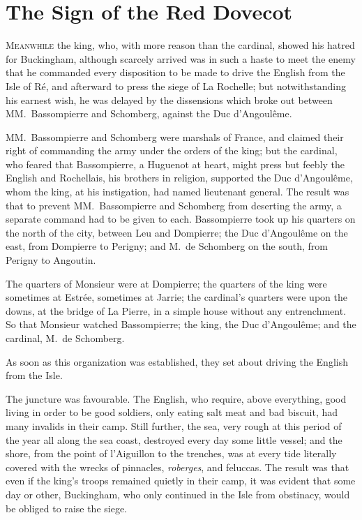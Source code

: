 
\chapter{The Sign of the Red Dovecot}

\lettrine{M}{eanwhile} the king, who, with more reason than the cardinal, showed his hatred for Buckingham, although scarcely arrived was in such a haste to meet the enemy that he commanded every disposition to be made to drive the English from the Isle of Ré, and afterward to press the siege of La Rochelle; but notwithstanding his earnest wish, he was delayed by the dissensions which broke out between MM.~Bassompierre and Schomberg, against the Duc d'Angoulême. 

MM.~Bassompierre and Schomberg were marshals of France, and claimed their right of commanding the army under the orders of the king; but the cardinal, who feared that Bassompierre, a Huguenot at heart, might press but feebly the English and Rochellais, his brothers in religion, supported the Duc d'Angoulême, whom the king, at his instigation, had named lieutenant general. The result was that to prevent MM.~Bassompierre and Schomberg from deserting the army, a separate command had to be given to each. Bassompierre took up his quarters on the north of the city, between Leu and Dompierre; the Duc d'Angoulême on the east, from Dompierre to Perigny; and M.~de Schomberg on the south, from Perigny to Angoutin. 

The quarters of Monsieur were at Dompierre; the quarters of the king were sometimes at Estrée, sometimes at Jarrie; the cardinal's quarters were upon the downs, at the bridge of La Pierre, in a simple house without any entrenchment. So that Monsieur watched Bassompierre; the king, the Duc d'Angoulême; and the cardinal, M.~de Schomberg. 

As soon as this organization was established, they set about driving the English from the Isle. 

The juncture was favourable. The English, who require, above everything, good living in order to be good soldiers, only eating salt meat and bad biscuit, had many invalids in their camp. Still further, the sea, very rough at this period of the year all along the sea coast, destroyed every day some little vessel; and the shore, from the point of l'Aiguillon to the trenches, was at every tide literally covered with the wrecks of pinnacles, \textit{roberges}, and feluccas. The result was that even if the king's troops remained quietly in their camp, it was evident that some day or other, Buckingham, who only continued in the Isle from obstinacy, would be obliged to raise the siege. 

